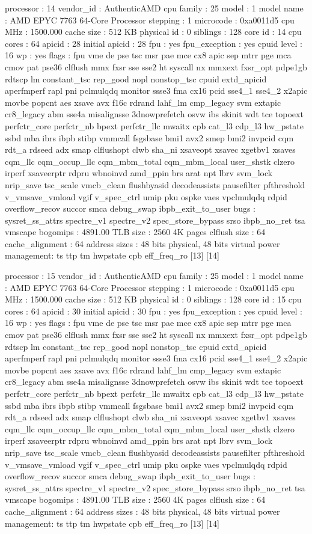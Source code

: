 processor	: 14
vendor_id	: AuthenticAMD
cpu family	: 25
model		: 1
model name	: AMD EPYC 7763 64-Core Processor
stepping	: 1
microcode	: 0xa0011d5
cpu MHz		: 1500.000
cache size	: 512 KB
physical id	: 0
siblings	: 128
core id		: 14
cpu cores	: 64
apicid		: 28
initial apicid	: 28
fpu		: yes
fpu_exception	: yes
cpuid level	: 16
wp		: yes
flags		: fpu vme de pse tsc msr pae mce cx8 apic sep mtrr pge mca cmov pat pse36 clflush mmx fxsr sse sse2 ht syscall nx mmxext fxsr_opt pdpe1gb rdtscp lm constant_tsc rep_good nopl nonstop_tsc cpuid extd_apicid aperfmperf rapl pni pclmulqdq monitor ssse3 fma cx16 pcid sse4_1 sse4_2 x2apic movbe popcnt aes xsave avx f16c rdrand lahf_lm cmp_legacy svm extapic cr8_legacy abm sse4a misalignsse 3dnowprefetch osvw ibs skinit wdt tce topoext perfctr_core perfctr_nb bpext perfctr_llc mwaitx cpb cat_l3 cdp_l3 hw_pstate ssbd mba ibrs ibpb stibp vmmcall fsgsbase bmi1 avx2 smep bmi2 invpcid cqm rdt_a rdseed adx smap clflushopt clwb sha_ni xsaveopt xsavec xgetbv1 xsaves cqm_llc cqm_occup_llc cqm_mbm_total cqm_mbm_local user_shstk clzero irperf xsaveerptr rdpru wbnoinvd amd_ppin brs arat npt lbrv svm_lock nrip_save tsc_scale vmcb_clean flushbyasid decodeassists pausefilter pfthreshold v_vmsave_vmload vgif v_spec_ctrl umip pku ospke vaes vpclmulqdq rdpid overflow_recov succor smca debug_swap ibpb_exit_to_user
bugs		: sysret_ss_attrs spectre_v1 spectre_v2 spec_store_bypass srso ibpb_no_ret tsa vmscape
bogomips	: 4891.00
TLB size	: 2560 4K pages
clflush size	: 64
cache_alignment	: 64
address sizes	: 48 bits physical, 48 bits virtual
power management: ts ttp tm hwpstate cpb eff_freq_ro [13] [14]

processor	: 15
vendor_id	: AuthenticAMD
cpu family	: 25
model		: 1
model name	: AMD EPYC 7763 64-Core Processor
stepping	: 1
microcode	: 0xa0011d5
cpu MHz		: 1500.000
cache size	: 512 KB
physical id	: 0
siblings	: 128
core id		: 15
cpu cores	: 64
apicid		: 30
initial apicid	: 30
fpu		: yes
fpu_exception	: yes
cpuid level	: 16
wp		: yes
flags		: fpu vme de pse tsc msr pae mce cx8 apic sep mtrr pge mca cmov pat pse36 clflush mmx fxsr sse sse2 ht syscall nx mmxext fxsr_opt pdpe1gb rdtscp lm constant_tsc rep_good nopl nonstop_tsc cpuid extd_apicid aperfmperf rapl pni pclmulqdq monitor ssse3 fma cx16 pcid sse4_1 sse4_2 x2apic movbe popcnt aes xsave avx f16c rdrand lahf_lm cmp_legacy svm extapic cr8_legacy abm sse4a misalignsse 3dnowprefetch osvw ibs skinit wdt tce topoext perfctr_core perfctr_nb bpext perfctr_llc mwaitx cpb cat_l3 cdp_l3 hw_pstate ssbd mba ibrs ibpb stibp vmmcall fsgsbase bmi1 avx2 smep bmi2 invpcid cqm rdt_a rdseed adx smap clflushopt clwb sha_ni xsaveopt xsavec xgetbv1 xsaves cqm_llc cqm_occup_llc cqm_mbm_total cqm_mbm_local user_shstk clzero irperf xsaveerptr rdpru wbnoinvd amd_ppin brs arat npt lbrv svm_lock nrip_save tsc_scale vmcb_clean flushbyasid decodeassists pausefilter pfthreshold v_vmsave_vmload vgif v_spec_ctrl umip pku ospke vaes vpclmulqdq rdpid overflow_recov succor smca debug_swap ibpb_exit_to_user
bugs		: sysret_ss_attrs spectre_v1 spectre_v2 spec_store_bypass srso ibpb_no_ret tsa vmscape
bogomips	: 4891.00
TLB size	: 2560 4K pages
clflush size	: 64
cache_alignment	: 64
address sizes	: 48 bits physical, 48 bits virtual
power management: ts ttp tm hwpstate cpb eff_freq_ro [13] [14]

